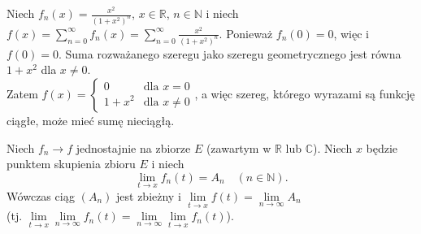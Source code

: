 \documentclass[leqno]{article}
\begin{document}
\begin{justify}
\begin{ex}
    Niech $f_n(x) = \frac{x^2}{{(1+x^2)}^n}$, $x \in \mathbb{R}$, $n \in \mathbb{N}$ i niech
    $f(x) = \sum\limits_{n=0}^{\infty}f_n(x) = \sum\limits_{n=0}^{\infty}\frac{x^2}{{(1+x^2)}^n}$.
    Ponieważ $f_n(0) = 0$, więc i $f(0) = 0$. Suma rozważanego szeregu jako szeregu geometrycznego jest równa $1 + x^2$ dla $x \neq 0$. \\
    Zatem $f(x) = \begin{cases} 0 & \text{dla } x = 0 \\ 1 + x^2 & \text{dla } x \neq 0 \end{cases}$, a
    więc szereg, którego wyrazami są funkcję ciągłe, może mieć sumę nieciągłą.
\end{ex}

\begin{theorem}
{
    Niech $f_n \to f$ jednostajnie na zbiorze $E$ (zawartym w $\mathbb{R}$ lub $\mathbb{C}$).
    Niech $x$ będzie punktem skupienia zbioru $E$ i niech 
    \[
        \lim\limits_{t \to x}f_n(t) = A_n \quad (n \in \mathbb{N}).
    \]
    Wówczas ciąg $(A_n)$ jest zbieżny i $\lim\limits_{t \to x}f(t) = \lim\limits_{n \to \infty}A_n$ \\ 
    (tj. $\lim\limits_{t \to x} \lim\limits_{n \to \infty}f_n(t) = \lim\limits_{n \to \infty}\lim\limits_{t \to x}f_n(t)$).
}
\end{theorem}


\end{justify}
\end{document}
